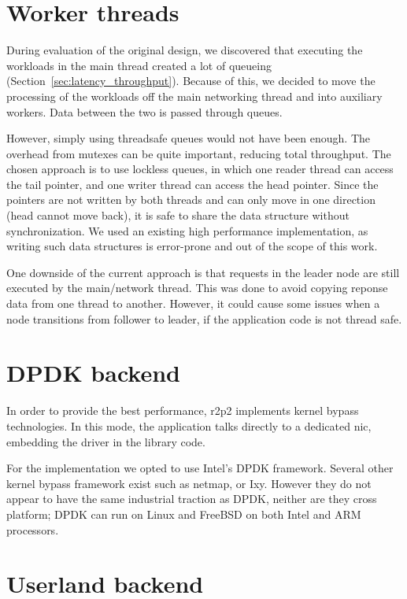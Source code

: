 \section{Worker threads}

During evaluation of the original design, we discovered that executing the workloads in the main thread created a lot of queueing (Section~\ref{sec:latency_throughput}).
Because of this, we decided to move the processing of the workloads off the main networking thread and into auxiliary workers.
Data between the two is passed through queues.

However, simply using threadsafe queues would not have been enough.
The overhead from mutexes can be quite important, reducing total throughput.
The chosen approach is to use lockless queues, in which one reader thread can access the tail pointer, and one writer thread can access the head pointer.
Since the pointers are not written by both threads and can only move in one direction (head cannot move back), it is safe to share the data structure without synchronization.
We used an existing high performance implementation\cite{fast_queue}, as writing such data structures is error-prone and out of the scope of this work.

One downside of the current approach is that requests in the leader node are still executed by the main/network thread.
This was done to avoid copying reponse data from one thread to another.
However, it could cause some issues when a node transitions from follower to leader, if the application code is not thread safe.

\section{DPDK backend}

In order to provide the best performance, \gls{r2p2} implements kernel bypass technologies.
In this mode, the application talks directly to a dedicated \gls{nic}, embedding the driver in the library code.

For the implementation we opted to use Intel's DPDK framework.
Several other kernel bypass framework exist such as netmap\cite{netmap}, or Ixy\cite{ixy}.
However they do not appear to have the same industrial traction as DPDK, neither are they cross platform; DPDK can run on Linux and FreeBSD on both Intel and ARM processors.

\section{Userland backend}


